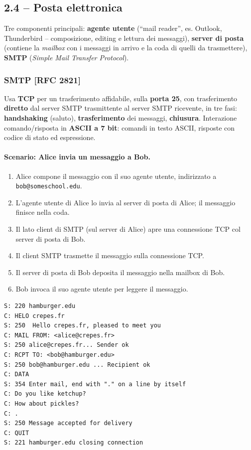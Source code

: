 \documentclass[12pt, a4paper]{article}
\begin{document}
\subsection{2.4 -- Posta elettronica}

Tre componenti principali: \textbf{agente utente} (``mail reader'', es. Outlook, Thunderbird -- composizione, editing e lettura dei messaggi), \textbf{server di posta} (contiene la \textit{mailbox} con i messaggi in arrivo e la coda di quelli da trasmettere), \textbf{SMTP} (\textit{Simple Mail Transfer Protocol}).

\subsubsection{SMTP [RFC 2821]}

Usa \textbf{TCP} per un trasferimento affidabile, sulla \textbf{porta 25}, con trasferimento \textbf{diretto} dal server SMTP trasmittente al server SMTP ricevente, in tre fasi: \textbf{handshaking} (saluto), \textbf{trasferimento} dei messaggi, \textbf{chiusura}. Interazione comando/risposta in \textbf{ASCII a 7 bit}: comandi in testo ASCII, risposte con codice di stato ed espressione.

\paragraph{Scenario: Alice invia un messaggio a Bob.}
\begin{enumerate}
    \item Alice compone il messaggio con il suo agente utente, indirizzato a \texttt{bob@someschool.edu}.
    \item L'agente utente di Alice lo invia al server di posta di Alice; il messaggio finisce nella coda.
    \item Il lato client di SMTP (sul server di Alice) apre una connessione TCP col server di posta di Bob.
    \item Il client SMTP trasmette il messaggio sulla connessione TCP.
    \item Il server di posta di Bob deposita il messaggio nella mailbox di Bob.
    \item Bob invoca il suo agente utente per leggere il messaggio.
\end{enumerate}

\begin{tcolorbox}[colback=lightergray!10, colframe=tocsec, title=\textbf{Esempio classico di interazione SMTP}]
\begin{verbatim}
S: 220 hamburger.edu
C: HELO crepes.fr
S: 250  Hello crepes.fr, pleased to meet you
C: MAIL FROM: <alice@crepes.fr>
S: 250 alice@crepes.fr... Sender ok
C: RCPT TO: <bob@hamburger.edu>
S: 250 bob@hamburger.edu ... Recipient ok
C: DATA
S: 354 Enter mail, end with "." on a line by itself
C: Do you like ketchup?
C: How about pickles?
C: .
S: 250 Message accepted for delivery
C: QUIT
S: 221 hamburger.edu closing connection
\end{verbatim}
\end{tcolorbox}
\end{document}
